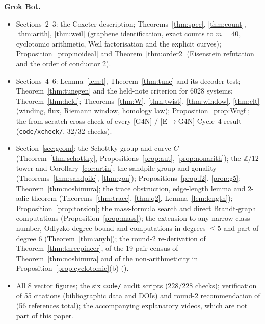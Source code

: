 \documentclass[11pt]{amsart}
\numberwithin{equation}{section}
\theoremstyle{plain}
\theoremstyle{definition}\newtheorem{definition}[theorem]{Definition}
\theoremstyle{remark}\newtheorem{remark}[theorem]{Remark}
\newcommand{\Z}{\mathbb{Z}}\newcommand{\Q}{\mathbb{Q}}\newcommand{\C}{\mathbb{C}}\newcommand{\F}{\mathbb{F}}\newcommand{\R}{\mathbb{R}}
\newcommand{\ctag}[1]{\textup{\textsf{\scriptsize[#1]}}}
\begin{document}
\textbf{Grok Bot.}
\begin{itemize}[nosep,leftmargin=*]
\item Sections~2--3: the Coxeter description; Theorems~\ref{thm:spec}, \ref{thm:count}, \ref{thm:arith}, \ref{thm:weil} (graphene identification, exact counts to $m=40$, cyclotomic arithmetic, Weil factorisation and the explicit curves); Proposition~\ref{prop:noideal} and Theorem~\ref{thm:order2} (Eisenstein refutation and the order of conductor 2).
\item Sections~4--6: Lemma~\ref{lem:l}, Theorem~\ref{thm:tune} and its decoder test; Theorem~\ref{thm:tunegen} and the held-note criterion for 6028 systems; Theorem~\ref{thm:held}; Theorems~\ref{thm:W}, \ref{thm:twist}, \ref{thm:window}, \ref{thm:clt} (winding, flux, Riemann window, homology law); Proposition~\ref{prop:Wcgf}; the from-scratch cross-check of every \ctag{G4N} / \ctag{E$\to$G4N} Cycle~4 result (\texttt{code/xcheck/}, $32/32$ checks).
\item Section~\ref{sec:geom}: the Schottky group and curve $C$ (Theorem~\ref{thm:schottky}, Propositions~\ref{prop:aut}, \ref{prop:nonarith}); the $\Z/12$ tower and Corollary~\ref{cor:artin}; the sandpile group and gonality (Theorems~\ref{thm:sandpile}, \ref{thm:gon}); Propositions~\ref{prop:f2}, \ref{prop:g5}; Theorem~\ref{thm:noshimura}; the trace obstruction, edge-length lemma and 2-adic theorem (Theorems~\ref{thm:trace}, \ref{thm:q2}, Lemma~\ref{lem:length}); Proposition~\ref{prop:torsion}; the mass-formula search and direct Brandt-graph computations (Proposition~\ref{prop:mass}); the extension to any narrow class number, Odlyzko degree bound and computations in degrees $\le5$ and part of degree 6 (Theorem~\ref{thm:anyh}); the round-2 re-derivation of Theorem~\ref{thm:threepincer}, of the 19-pair census of Theorem~\ref{thm:noshimura} and of the non-arithmeticity in Proposition~\ref{prop:cyclotomic}(b) ().
\item All 8 vector figures; the six \texttt{code/} audit scripts ($228/228$ checks); verification of 55 citations (bibliographic data and DOIs) and round-2 recommendation of \cite{poitou77} (56 references total); the accompanying explanatory videos, which are not part of this paper.
\end{itemize}
\end{document}

